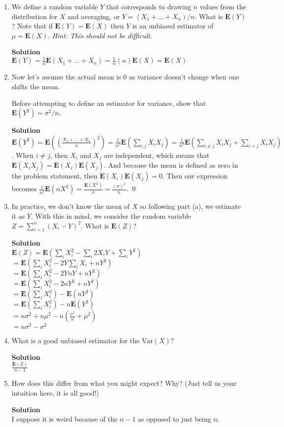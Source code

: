 \documentclass[11pt]{article}
\newenvironment{Parts}{\begin{enumerate}[label=(\alph*)]}{\end{enumerate}}
\newcommand*{\Part}{\item}
\newenvironment{Answer}{\vspace{10pt}\begin{mdframed}\textbf{Solution}\\}{\end{mdframed}\vfill\pagebreak[3]}
\newenvironment{Answer}{\vspace{10pt}}{\vfill\pagebreak[3]}
\newcommand*{\E}{\textbf{E}}
\newcommand*{\Var}[1]{\text{Var}(#1)}
\begin{document}
\begin{Parts}
  \Part We define a random variable $Y$ that corresponds to drawing $n$
    values from the distribution for $X$ and averaging, or $Y =
    (X_1 + \ldots + X_n)/n$.  What is $\E(Y)$?  Note that if
    $\E(Y) = \E(X)$ then $Y$ is an unbiased estimator of $\mu = 
    \E(X)$. {\em Hint: This should not be difficult.}
  \begin{Answer}
$\E(Y)=\frac{1}{n}\E(X_1+...+X_n)=\frac{1}{n}(n)\E(X)=\E(X)$
  \end{Answer}

  \Part Now let's assume the actual mean is $0$ as variance doesn't
    change when one shifts the mean.

  Before attempting to define an estimator for variance, show that
  $\E(Y^2) = \sigma^2/n$.  
  \begin{Answer}
$\E(Y^2)=\E((\frac{X_1+...+X_n}{n})^2)=\frac{1}{n^2}\E(\sum_{i,j}X_iX_j)=\frac{1}{n^2}\E(\sum_{i \neq j}X_iX_j+\sum_{i=j}X_iX_j)$. When $i \neq j$, then $X_i$ and $X_j$ are independent, which means that $\E(X_iX_j)=\E(X_i)\E(X_j)$. And because the mean is defined as zero in the problem statement, then $\E(X_i)\E(X_j)=0$. Then our expression becomes $\frac{1}{n^2}\E(nX^2)=\frac{\E(X^2)}{n}=\frac{(\sigma)^2}{n}$. \qed
  \end{Answer}

  \Part In practice, we don't know the mean of $X$ so following
    part (a), we estimate it as $Y$. With this in mind, we consider the random variable $Z =
    \sum_{i=1}^n (X_i -Y)^2$.  What is $\E(Z)$?
  \begin{Answer}
$\E(Z)=\E(\sum_iX_i^2-\sum_i2X_iY+\sum_iY^2)$\\
$=\E(\sum_iX_i^2-2Y\sum_iX_i+nY^2)$\\
$=\E(\sum_iX_i^2-2YnY+nY^2)$\\
$=\E(\sum_iX_i^2-2nY^2+nY^2)$\\
$=\E(\sum_iX_i^2)-\E(nY^2)$\\
$=\E(\sum_iX_i^2)-n\E(Y^2)$\\
$=n\sigma^2+n\mu^2-n(\frac{\sigma^2}{n}+\mu^2)$\\
$=n\sigma^2-\sigma^2$
  \end{Answer}

  \Part What is a good unbiased estimator for the $\Var{X}$?
  \begin{Answer}
$\frac{\E(Z)}{n-1}$
  \end{Answer}

  \Part How does this differ from what you might expect? Why?
  (Just tell us your intuition here, it is all good!)
  \begin{Answer}
I suppose it is weird because of the $n-1$ as opposed to just being $n$.
  \end{Answer}
\end{Parts}
\end{document}
